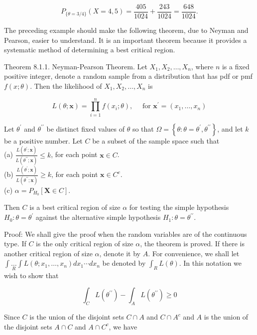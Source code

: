 $$
P_{\{\theta=3 / 4\}}(X=4,5)=\frac{405}{1024}+\frac{243}{1024}=\frac{648}{1024} .
$$

The preceding example should make the following theorem, due to Neyman and Pearson, easier to understand. It is an important theorem because it provides a systematic method of determining a best critical region.

Theorem 8.1.1. Neyman-Pearson Theorem. Let $X_{1}, X_{2}, \ldots, X_{n}$, where $n$ is a fixed positive integer, denote a random sample from a distribution that has pdf or pmf $f(x ; \theta)$. Then the likelihood of $X_{1}, X_{2}, \ldots, X_{n}$ is

$$
L(\theta ; \mathbf{x})=\prod_{i=1}^{n} f\left(x_{i} ; \theta\right), \quad \text { for } \mathbf{x}^{\prime}=\left(x_{1}, \ldots, x_{n}\right)
$$

Let $\theta^{\prime}$ and $\theta^{\prime \prime}$ be distinct fixed values of $\theta$ so that $\Omega=\left\{\theta: \theta=\theta^{\prime}, \theta^{\prime \prime}\right\}$, and let $k$ be a positive number. Let $C$ be a subset of the sample space such that\\
(a) $\frac{L\left(\theta^{\prime} ; \mathbf{x}\right)}{L\left(\theta^{\prime \prime} ; \mathbf{x}\right)} \leq k$, for each point $\mathbf{x} \in C$.\\
(b) $\frac{L\left(\theta^{\prime} ; \mathbf{x}\right)}{L\left(\theta^{\prime \prime} ; \mathbf{x}\right)} \geq k$, for each point $\mathbf{x} \in C^{c}$.\\
(c) $\alpha=P_{H_{0}}[\mathbf{X} \in C]$.

Then $C$ is a best critical region of size $\alpha$ for testing the simple hypothesis $H_{0}: \theta=\theta^{\prime}$ against the alternative simple hypothesis $H_{1}: \theta=\theta^{\prime \prime}$.

Proof: We shall give the proof when the random variables are of the continuous type. If $C$ is the only critical region of size $\alpha$, the theorem is proved. If there is another critical region of size $\alpha$, denote it by $A$. For convenience, we shall let $\int \underset{R}{\ldots} \int L\left(\theta ; x_{1}, \ldots, x_{n}\right) d x_{1} \cdots d x_{n}$ be denoted by $\int_{R} L(\theta)$. In this notation we wish to show that

$$
\int_{C} L\left(\theta^{\prime \prime}\right)-\int_{A} L\left(\theta^{\prime \prime}\right) \geq 0
$$

Since $C$ is the union of the disjoint sets $C \cap A$ and $C \cap A^{c}$ and $A$ is the union of the disjoint sets $A \cap C$ and $A \cap C^{c}$, we have


